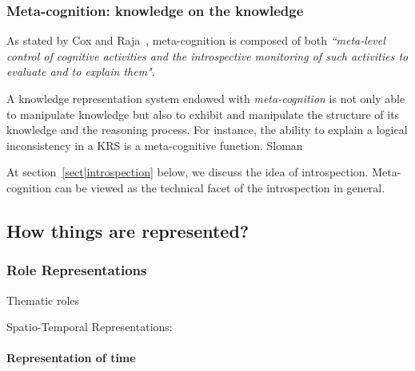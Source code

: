 \subsubsection{Meta-cognition: knowledge on the knowledge}

As stated by Cox and Raja~\cite{Cox2007}, meta-cognition is composed of both
\emph{``meta-level control of cognitive activities and the introspective
monitoring of such activities to evaluate and to explain them"}.

A knowledge representation system endowed with \emph{meta-cognition} is not
only able to manipulate knowledge but also to exhibit and manipulate the
structure of its knowledge and the reasoning process. For instance, the ability
to explain a logical inconsistency in a KRS is a meta-cognitive function.
Sloman~\cite{Sloman2011} 

At section~\ref{sect|introspection} below, we discuss the idea of
introspection.  Meta-cognition can be viewed as the technical facet of the
introspection in general.


\subsection{How things are represented?}
\label{sect|higher-level-domain-representation}

\begin{scriptsize}
\begin{center}
\end{center}
\end{scriptsize}


\subsubsection{Role Representations}

Thematic roles

Spatio-Temporal Representations:

\paragraph{Representation of time}

